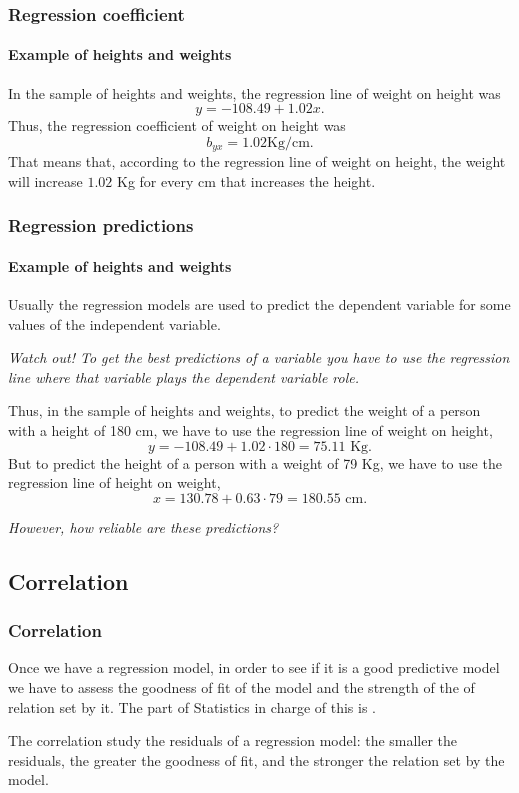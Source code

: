 \begin{frame}
\frametitle{Regression coefficient}
\framesubtitle{Example of heights and weights}
In the sample of heights and weights, the regression line of weight on height was 
\[
y=-108.49 +1.02 x.
\]
Thus, the regression coefficient of weight on height was
\[
b_{yx}= 1.02 \mbox{Kg/cm.}
\]
That means that, according to the regression line of weight on height, the weight will increase $1.02$ Kg for every cm
that increases the height. 
\begin{center}

\end{center}
\end{frame}

\begin{frame}
\frametitle{Regression predictions}
\framesubtitle{Example of heights and weights}
Usually the regression models are used to predict the dependent variable for some values of the independent variable.
\begin{center}
\alert{\emph{Watch out! To get the best predictions of a variable you have to use the regression line where that
variable plays the dependent variable role.}}
\end{center}

Thus, in the sample of heights and weights, to predict the weight of a person with a height of 180 cm, we have to use
the regression line of weight on height,
\[
y = -108.49 + 1.02 \cdot 180  = 75.11 \mbox{ Kg}.
\]
But to predict the height of a person with a weight of 79 Kg, we have to use the regression line of height on weight, 
\[
x = 130.78 + 0.63\cdot 79 = 180.55 \mbox{ cm}.
\]
\begin{center}
\emph{However, how reliable are these predictions?}
\end{center}
\end{frame}


\subsection{Correlation}
\begin{frame}
\frametitle{Correlation}
Once we have a regression model, in order to see if it is a good predictive model we have to assess the goodness of
fit of the model and the strength of the of relation set by it. 
The part of Statistics in charge of this is .

The correlation study the residuals of a regression model: the smaller the residuals, the greater the goodness of fit,
and the stronger the relation set by the model. 
\end{frame}


